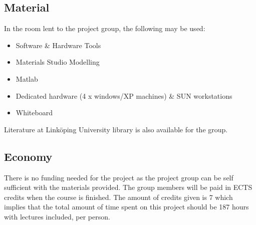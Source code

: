 \subsection{Material}

In the room lent to the project group, the following may be used:

\begin{itemize}
	\item Software {\&} Hardware Tools
	\item Materials Studio Modelling
	\item Matlab
	\item Dedicated hardware (4 x windows/XP machines) {\&} SUN workstations
	\item Whiteboard
\end{itemize}

Literature at Linköping University library is also available for the group.

\subsection{Economy}

There is no funding needed for the project as the project group can be self sufficient with the materials provided. The group members will be paid in ECTS credits when the course is finished. The amount of credits given is 7 which implies that the total amount of time spent on this project should be 187 hours with lectures included, per person.












